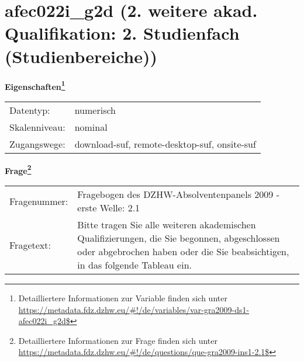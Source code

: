 
    \setcounter{footnote}{0}

    \vspace*{-1.8cm}
	\section{afec022i\_g2d (2. weitere akad. Qualifikation: 2. Studienfach (Studienbereiche))}
	\label{section:afec022i_g2d}



    \vspace*{0.5cm}
    \noindent\textbf{Eigenschaften\footnote{Detailliertere Informationen zur Variable finden sich unter
		\url{https://metadata.fdz.dzhw.eu/\#!/de/variables/var-gra2009-ds1-afec022i_g2d$}}}\\
	\begin{tabularx}{\hsize}{@{}lX}
	Datentyp: & numerisch \\
	Skalenniveau: & nominal \\
	Zugangswege: &
	  download-suf, 
	  remote-desktop-suf, 
	  onsite-suf
 \\
    \end{tabularx}



				\vspace*{0.5cm}
                \noindent\textbf{Frage\footnote{Detailliertere Informationen zur Frage finden sich unter
		              \url{https://metadata.fdz.dzhw.eu/\#!/de/questions/que-gra2009-ins1-2.1$}}}\\
				\begin{tabularx}{\hsize}{@{}lX}
					Fragenummer: &
					  Fragebogen des DZHW-Absolventenpanels 2009 - erste Welle:
					  2.1
 \\
					Fragetext: & Bitte tragen Sie alle weiteren akademischen Qualifizierungen, die Sie begonnen, abgeschlossen oder abgebrochen haben oder die Sie beabsichtigen, in das folgende Tableau ein. \\
				\end{tabularx}





